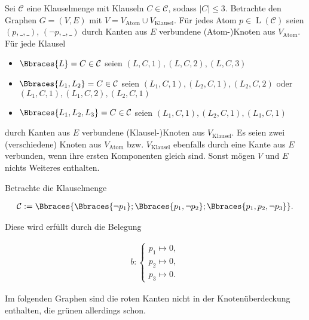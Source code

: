 
\begin{solution}

Sei $\mathcal C$ eine Klauselmenge mit Klauseln $C \in \mathcal C$, sodass $|C| \leq 3$.
Betrachte den Graphen $G = (V, E)$ mit $V = V_\text{Atom} \cup V_\text{Klausel}$.
Für jedes Atom $p \in \operatorname L(\mathcal C)$ seien $(p, \_, \_)$, $(\neg p, \_, \_)$ durch Kanten aus $E$ verbundene (Atom-)Knoten aus $V_\text{Atom}$.
Für jede Klausel

\begin{itemize}
    \item $\Bbraces{L} = C \in \mathcal C$ seien $(L, C, 1), (L, C, 2), (L, C, 3)$
    \item $\Bbraces{L_1, L_2} = C \in \mathcal C$ seien $(L_1, C, 1), (L_2, C, 1), (L_2, C, 2)$ oder $(L_1, C, 1), (L_1, C, 2), (L_2, C, 1)$
    \item $\Bbraces{L_1, L_2, L_3} = C \in \mathcal C$ seien $(L_1, C, 1), (L_2, C, 1), (L_3, C, 1)$
\end{itemize}

durch Kanten aus $E$ verbundene (Klausel-)Knoten aus $V_\text{Klausel}$.
Es seien zwei (verschiedene) Knoten aus $V_\text{Atom}$ bzw. $V_\text{Klausel}$ ebenfalls durch eine Kante aus $E$ verbunden, wenn ihre ersten Komponenten gleich sind.
Sonst mögen $V$ und $E$ nichts Weiteres enthalten.

\begin{example*}

    Betrachte die Klauselmenge

    \begin{align*}
        \mathcal C
        :=
        \Bbraces{\Bbraces{\neg p_1}; \Bbraces{p_1, \neg p_2}; \Bbraces{p_1, p_2, \neg p_3}}.
    \end{align*}

    Diese wird erfüllt durch die Belegung

    \begin{align*}
        b:
        \begin{cases}
            p_1 \mapsto 0, \\
            p_2 \mapsto 0, \\
            p_3 \mapsto 0.
        \end{cases}
    \end{align*}

    Im folgenden Graphen sind die roten Kanten nicht in der Knotenüberdeckung enthalten, die grünen allerdings schon.


\end{example*}
\end{solution}

